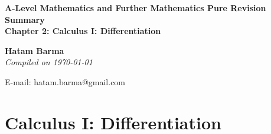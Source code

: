 \documentclass[11pt, a4paper]{article}
\begin{document}
\begin{titlepage}
   \begin{center}
       \vspace*{2.5cm}
	\huge
       \textbf{A-Level Mathematics and Further Mathematics Pure Revision Summary} \\
	\vspace{1cm}
	\Large
       \textbf{Chapter 2: Calculus I: Differentiation}
            
       \vspace{1.5cm}
	\LARGE
       \textbf{Hatam Barma} \\
	\vspace{0.75cm}
       \normalsize
       \emph{Compiled on \Datea\today} \\

       \vfill
        

	E-mail: hatam.barma@gmail.com
   \end{center}
\end{titlepage}


\tableofcontents

\clearpage
\section{Calculus I: Differentiation}
\vspace{0.5cm}
\end{document}
